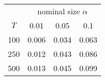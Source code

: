 % 
\begin{tabular}{cccc}
  \hline
  & \multicolumn{3}{c}{nominal size $\alpha$} \\
 $T$ & 0.01 & 0.05 & 0.1 \\
 \hline
100 & 0.006 & 0.034 & 0.063 \\ 
  250 & 0.012 & 0.043 & 0.086 \\ 
  500 & 0.013 & 0.045 & 0.099 \\ 
   \hline
\end{tabular}
